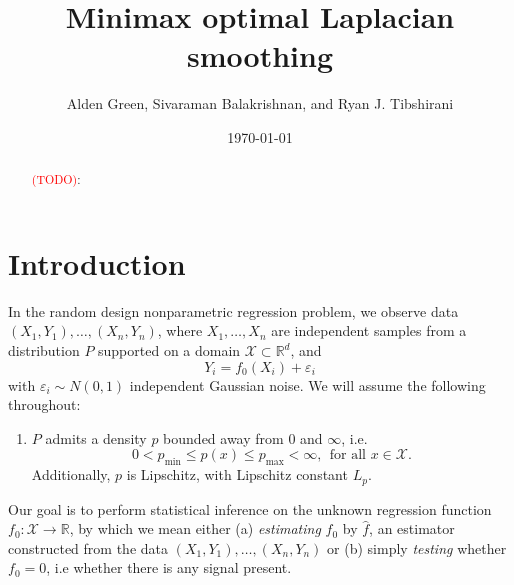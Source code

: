 \documentclass{article}
\newcommand{\Reals}{\mathbb{R}}
\newcommand{\1}{\mathbf{1}}
\newcommand{\Xset}{\mathcal{X}}
\newcommand{\wh}[1]{\widehat{#1}}
\theoremstyle{alden}
\theoremstyle{aldenthm}
\theoremstyle{definition}
\theoremstyle{remark}
\begin{document}
\title{Minimax optimal Laplacian smoothing}
\author{Alden Green, Sivaraman Balakrishnan, and Ryan J. Tibshirani}
\date{\today}
\maketitle

\begin{abstract}
	\textcolor{red}{(TODO)}:
\end{abstract}

\section{Introduction}

In the random design nonparametric regression problem, we observe data $(X_1,Y_1),\ldots,(X_n,Y_n)$, where $X_1,\ldots,X_n$ are independent samples from a distribution $P$ supported on a domain $\Xset \subset \Reals^d$, and 
\begin{equation}
\label{eqn:random_design_regression}
Y_i = f_0(X_i) + \varepsilon_i
\end{equation}
with $\varepsilon_i \sim N(0,1)$ independent Gaussian noise. We will assume the following throughout:
\begin{enumerate}[label=(P\arabic*)]
	\item
	\label{asmp:bounded_lipschitz_density} 
	$P$ admits a density $p$ bounded away from $0$ and $\infty$, i.e.
	\begin{equation*}
	0 < p_{\min} \leq p(x) \leq p_{\max} < \infty,~~\textrm{for all $x \in \Xset$.}
	\end{equation*}
	Additionally, $p$ is Lipschitz, with Lipschitz constant $L_p$.
\end{enumerate}
Our goal is to perform statistical inference on the unknown regression function $f_0: \Xset \to \Reals$, by which we mean either (a) \emph{estimating} $f_0$ by $\wh{f}$, an estimator constructed from the data $(X_1,Y_1),\ldots,(X_n,Y_n)$ or (b) simply \emph{testing} whether $f_0 = 0$, i.e whether there is any signal present. 
\end{document}
